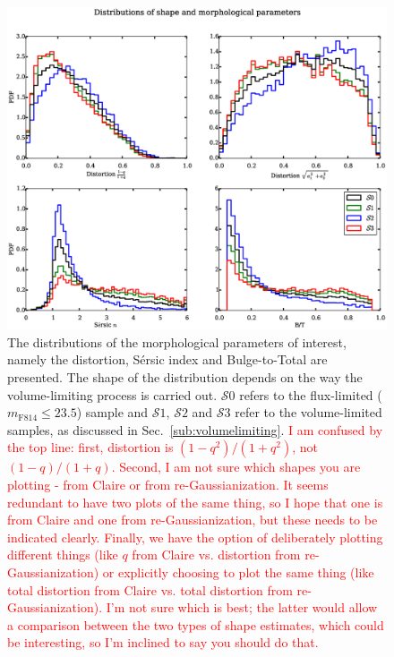 \documentclass[twocolumn,useAMS,usenatbib]{mn2e}
\newcommand{\rachel}[1]{{\textcolor{red}{#1}}}
\newcommand{\sersic}{S\'{e}rsic }
\newcommand{\btt}{Bulge-to-Total }
\newcommand{\s}{\ensuremath{\mathcal{S}}}
\begin{document}
% 
\begin{figure}
 \centering
 \includegraphics[width=2.2\columnwidth]{sample_histograms}
 \caption{The distributions of the morphological parameters of interest, namely the distortion, \sersic index and \btt are presented. 
          The shape of the distribution depends on the way the volume-limiting process is carried out. \s$0$ refers to the flux-limited ($m_\text{F814}\le23.5$) sample
          and \s$1$, \s$2$ and \s$3$ refer to the volume-limited
          samples, as discussed in
          Sec.~\ref{sub:volumelimiting}. \rachel{I am confused by the
            top line: first, distortion is $(1-q^2)/(1+q^2)$, not
            $(1-q)/(1+q)$.  Second, I am not sure which shapes you are
          plotting - from Claire or from re-Gaussianization.  It seems
        redundant to have two plots of the same thing, so I hope that
        one is from Claire and one from re-Gaussianization, but these
        needs to be indicated clearly.  Finally, we have the option of
      deliberately plotting different things (like $q$ from Claire
      vs. distortion from re-Gaussianization) or explicitly choosing
      to plot the same thing (like total distortion from Claire
      vs. total distortion from re-Gaussianization).  I'm not sure
      which is best; the latter would allow a comparison between the
      two types of shape estimates, which could be interesting, so I'm
      inclined to say you should do that.}}
  \label{fig:sample_histograms}
\end{figure}
\end{document}
